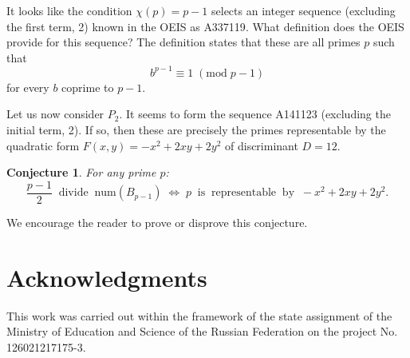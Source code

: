 \documentclass[reqno,a4paper,11pt]{amsart}
\numberwithin{equation}{section}
\newtheorem{conjecture}[theorem]{Conjecture}
\theoremstyle{definition}
\begin{document}
It looks like the condition $\chi(p)=p-1$ selects an integer sequence (excluding the first term, 2) known in the OEIS as \textrm{A337119}. What definition does the OEIS provide for this sequence? The definition states that these are all primes $p$ such that 
\[
b^{p-1} \equiv 1\; (\mathrm{mod}\; p-1)
\] 
for every $b$ coprime to $p-1$. 




Let us now consider $P_2$. It seems to form the sequence \textrm{A141123} (excluding the initial term, 2). If so, then these are precisely the primes representable by the quadratic form 
$F(x, y)=-x^2+2xy+2y^2$ of discriminant $D=12$.  
\begin{conjecture}
For any prime $p$: 
\[
\frac{p-1}{2}\;\; \mbox{divide}\;\; \mathrm{num}(B_{p-1})\; \Leftrightarrow\;  p\;\; \mbox{is}\;\; \mbox{representable}\;\; \mbox{by}\;\; -x^2+2xy+2y^2.
\] 
\end{conjecture}
We encourage the reader to prove or disprove this conjecture.

\section*{Acknowledgments}

This work was carried out within the framework of  the state assignment of the Ministry of Education
and Science of the Russian Federation on the project No.  126021217175-3.
\end{document}
